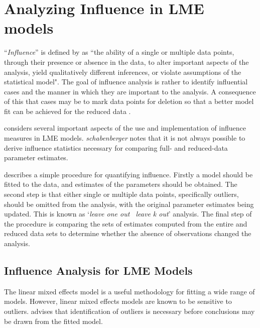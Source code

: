 \documentclass[00-MASTER.tex]{subfiles}
\begin{document}
	
\section{Analyzing Influence in LME models}
 ``\textit{Influence}” is defined by \citet{schab} as ``the ability of a single or multiple data points, through their presence
	or absence in the data, to alter important aspects of the analysis, yield qualitatively different inferences, or
	violate assumptions of the statistical model". The goal of influence analysis is rather to identify influential cases and the manner in
	which they are important to the analysis. A consequence of this that cases may be to mark data
	points for deletion so that a better model fit can be achieved for the reduced data \citep{schab}.  
	
	
	
	\citet{schab} considers several important aspects of the use and implementation of influence measures in LME models. \textit{schabenberger} notes that it is not always possible to
	derive influence statistics necessary for comparing full- and reduced-data parameter estimates. 

	\citet{schab} describes a simple procedure for quantifying influence. Firstly a model should be fitted to the data, and
	estimates of the parameters should be obtained. The second step is that either single or multiple data points, specifically outliers,
	should be omitted from the analysis, with the original parameter estimates being updated. This is known as `\textit{leave one out \ leave k out}' analysis. The final step of the procedure is comparing the 	sets of estimates computed from the entire and reduced data sets to determine whether the absence of observations changed the
	analysis.
	
	
	
	\subsection{Influence Analysis for LME Models} %
	The linear mixed effects model is a useful methodology for fitting a wide range of models. However, linear mixed effects models are known to be sensitive to outliers. \citet{CPJ} advises that identification of outliers is necessary before conclusions may be drawn from the fitted model.
\end{document}
